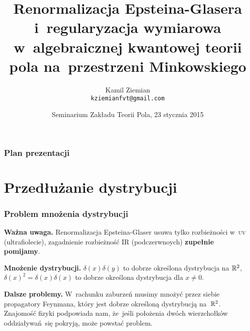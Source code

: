 \documentclass[10pt,t]{beamer}
\title{Renormalizacja Epsteina-Glasera i~regularyzacja
  wymiarowa w~algebraicznej kwantowej teorii pola na~przestrzeni
  Minkowskiego}
\author{Kamil Ziemian \\
  \texttt{kziemianfvt@gmail.com}}
\institute{Uniwersytet Jagielloński w~Krakowie}
\date[23 I 2015]{Seminarium Zakładu Teorii Pola, 23 stycznia 2015}
\begin{document}





\RaggedRight






\maketitle





\begin{frame}
  \frametitle{Plan prezentacji}


  \tableofcontents %

\end{frame}










\section{Przedłużanie dystrybucji}



\begin{frame}
  \frametitle{Problem mnożenia dystrybucji}


  \textbf{Ważna uwaga.}
  Renormalizacja Epsteina-Glaser usuwa tylko rozbieżności w~\textsc{uv}
  (ultrafiolecie), zagadnienie rozbieżność IR (podczerwnoych)
  \textbf{zupełnie pomijamy}.

  \VerSpaceFour





  \textbf{Mnożenie dystrybucji.}
  $\delta( x ) \delta( y )$ to dobrze określona dystrybucja na $\mathbb{R}^{ 2 }$, \\
  $\delta( x )^{ 2 } = \delta( x ) \delta( x )$ to dobrze określona dystrybucja dla $x \neq 0$.

  \VerSpaceFour





  \textbf{Dalsze problemy.}
  W~rachunku zaburzeń musimy mnożyć przez siebie propagatory Feynmana,
  który jest dobrze określoną dystrybucją na~$\mathbb{R}^{ 2 }$. Znajomość fizyki
  podpowiada nam, że~jeśli położenia dwóch wierzchołków
  oddziaływań~się pokryją, może powstać problem.

\end{frame}
\end{document}

